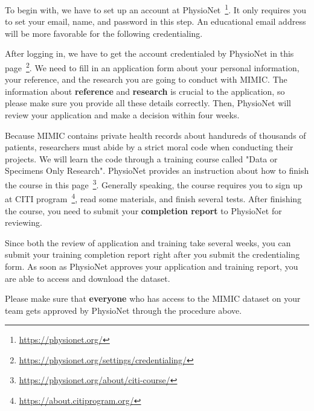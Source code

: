  To begin with, we have to set up an account at PhysioNet~\footnote{\url{https://physionet.org/}}. 
It only requires you to set your email, name, and password in this step.
An educational email address will be more favorable for the following credentialing.

 After logging in, we have to get the account credentialed by PhysioNet in this page~\footnote{\url{https://physionet.org/settings/credentialing/}}. 
We need to fill in an application form about your personal information, your reference, and the research you are going to conduct with MIMIC.
The information about \textbf{reference} and \textbf{research} is crucial to the application, so please make sure you provide all these details correctly.
Then, PhysioNet will review your application and make a decision within four weeks.

 Because MIMIC contains private health records about handureds of thousands of patients, researchers must abide by a strict moral code when conducting their projects.
We will learn the code through a training course called "Data or Specimens Only Research". 
PhysioNet provides an instruction about how to finish the course in this page~\footnote{\url{https://physionet.org/about/citi-course/}}.
Generally speaking, the course requires you to sign up at CITI program~\footnote{\url{https://about.citiprogram.org/}}, read some materials, and finish several tests.
After finishing the course, you need to submit your \textbf{completion report} to PhysioNet for reviewing.

Since both the review of application and training take several weeks, you can submit your training completion report right after you submit the credentialing form.
As soon as PhysioNet approves your application and training report, you are able to access and download the dataset.

Please make sure that \textbf{everyone} who has access to the MIMIC dataset on your team gets approved by PhysioNet through the procedure above.



